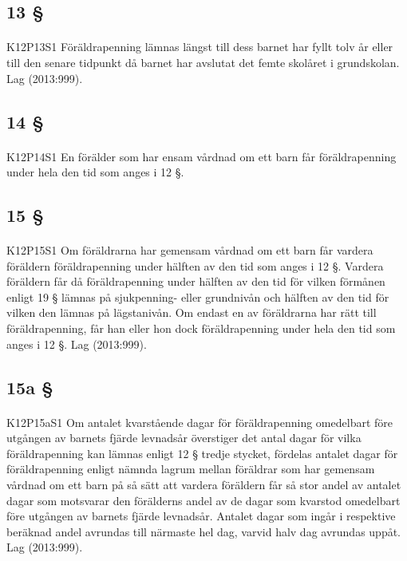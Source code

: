 \documentclass[a4paper,notitlepage,openany,10pt]{book}
\begin{document}
\subsection*{13 §}
\paragraph*{}
{\tiny K12P13S1}
Föräldrapenning lämnas längst till dess barnet har fyllt tolv år eller till den senare tidpunkt då barnet har avslutat det femte skolåret i grundskolan.
Lag (2013:999).
\subsection*{14 §}
\paragraph*{}
{\tiny K12P14S1}
En förälder som har ensam vårdnad om ett barn får föräldrapenning under hela den tid som anges i 12 §.
\subsection*{15 §}
\paragraph*{}
{\tiny K12P15S1}
Om föräldrarna har gemensam vårdnad om ett barn får vardera föräldern föräldrapenning under hälften av den tid som anges i 12 §. Vardera föräldern får då föräldrapenning under hälften av den tid för vilken förmånen enligt 19 § lämnas på sjukpenning- eller grundnivån och hälften av den tid för vilken den lämnas på lägstanivån. Om endast en av föräldrarna har rätt till föräldrapenning, får han eller hon dock föräldrapenning under hela den tid som anges i 12 §.
Lag (2013:999).
\subsection*{15a §}
\paragraph*{}
{\tiny K12P15aS1}
Om antalet kvarstående dagar för föräldrapenning omedelbart före utgången av barnets fjärde levnadsår överstiger det antal dagar för vilka föräldrapenning kan lämnas enligt 12 § tredje stycket, fördelas antalet dagar för föräldrapenning enligt nämnda lagrum mellan föräldrar som har gemensam vårdnad om ett barn på så sätt att vardera föräldern får så stor andel av antalet dagar som motsvarar den förälderns andel av de dagar som kvarstod omedelbart före utgången av barnets fjärde levnadsår. Antalet dagar som ingår i respektive beräknad andel avrundas till närmaste hel dag, varvid halv dag avrundas uppåt.
Lag (2013:999).
\end{document}
